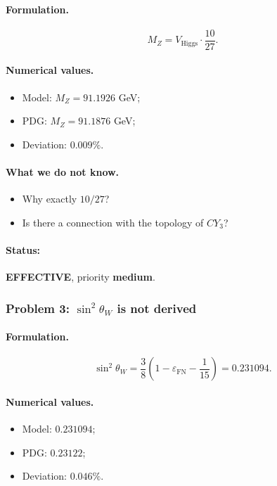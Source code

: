 \documentclass[11pt,a4paper]{article}
\newcommand{\CY}{CY_3}
\newcommand{\epsFN}{\varepsilon_{\text{FN}}}
\theoremstyle{definition}
\begin{document}
\paragraph{Formulation.}
\begin{equation}
    M_Z = V_{\text{Higgs}} \cdot \frac{10}{27}.
\end{equation}

\paragraph{Numerical values.}
\begin{itemize}
    \item Model: $M_Z = 91.1926$ GeV;
    \item PDG: $M_Z = 91.1876$ GeV;
    \item Deviation: $0.009\%$.
\end{itemize}

\paragraph{What we do not know.}
\begin{itemize}
    \item Why exactly $10/27$?
    \item Is there a connection with the topology of $\CY$?
\end{itemize}

\paragraph{Status:} \textbf{EFFECTIVE}, priority \textbf{medium}.

\subsubsection{Problem 3: $\sin^2\theta_W$ is not derived}

\paragraph{Formulation.}
\begin{equation}
    \sin^2\theta_W = \frac{3}{8} \left(1 - \epsFN - \frac{1}{15}\right)
    = 0.231094.
\end{equation}

\paragraph{Numerical values.}
\begin{itemize}
    \item Model: $0.231094$;
    \item PDG: $0.23122$;
    \item Deviation: $0.046\%$.
\end{itemize}
\end{document}
